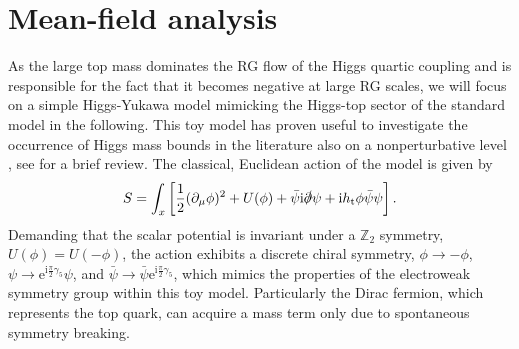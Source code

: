 \documentclass[twocolumn,aps,prd,showpacs,nofootinbib,superscriptaddress,preprintnumbers,floatfix,10pt]{revtex4-1}
\newcommand{\I}{\mathrm{i}}
\newcommand{\E}{\mathrm{e}}
\newcommand{\psib}{\bar{\psi}}
\newcommand{\htop}{h_{\mathrm{t}}}
\begin{document}
\section{Mean-field analysis}
\label{sec:MF}

As the large top mass dominates the RG flow of the Higgs quartic coupling and is responsible for the fact that it becomes negative at large RG scales, we will focus on a simple Higgs-Yukawa model mimicking the Higgs-top sector of the standard model in the following. This toy model has proven useful to investigate the occurrence of Higgs mass bounds in the literature also on a nonperturbative level \cite{Gies:2013fua,Holland:2003jr,Holland:2004sd,Branchina:2005tu,Fodor:2007fn}, see \cite{Gies:2017ajd} for a brief review. The classical, Euclidean action of the model is given by
%
\begin{align}
 S = \int_{x} 
 \left[ \frac{1}{2}(\partial_\mu \phi)^2 + U(\phi) +  \psib \I \slashed{\partial} \psi + \I \htop \phi \psib\psi \right]. 
 \label{eq:bareaction}
\end{align}
%
Demanding that the scalar potential is invariant under a $\mathbb{Z}_{2}$ symmetry, $U(\phi)=U(-\phi)$, the action exhibits a discrete chiral symmetry, $\phi \to -\phi$, $\psi \to \E^{\I \frac{\pi}{2} \gamma_5} \psi$, and $\psib \to \psib \E^{\I \frac{\pi}{2} \gamma_5}$, which mimics the properties of the electroweak symmetry group within this toy model. Particularly the Dirac fermion, which represents the top quark,  can acquire a mass term only due to spontaneous symmetry breaking.
\end{document}
